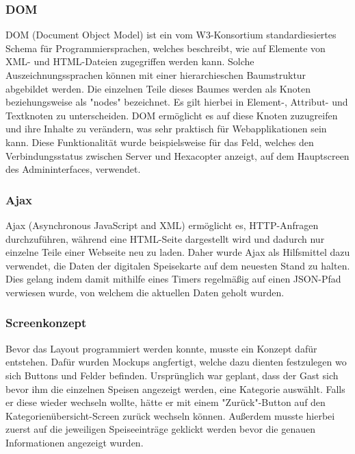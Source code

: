     \subsubsection{DOM}

{DOM\cite{dom}} (Document Object Model) ist ein vom W3-Konsortium standardiesiertes Schema für Programmiersprachen, welches beschreibt, wie auf Elemente von XML- und HTML-Dateien zugegriffen werden kann. Solche Auszeichnungssprachen können mit einer hierarchieschen Baumstruktur abgebildet werden. Die einzelnen Teile dieses Baumes werden als Knoten beziehungsweise als "nodes" bezeichnet.  Es gilt hierbei in Element-, Attribut- und Textknoten zu unterscheiden. DOM ermöglicht es auf diese Knoten zuzugreifen und ihre Inhalte zu verändern, was sehr praktisch für Webapplikationen sein kann. Diese Funktionalität wurde beispielsweise für das Feld, welches den Verbindungsstatus zwischen Server und Hexacopter anzeigt, auf dem Hauptscreen des Admininterfaces, verwendet.

    \subsubsection{Ajax}

{Ajax\cite{ajax}} (Asynchronous JavaScript and XML) ermöglicht es, HTTP-Anfragen durchzuführen, während eine HTML-Seite dargestellt wird und dadurch nur einzelne Teile einer Webseite neu zu laden. Daher wurde Ajax als Hilfsmittel dazu verwendet, die Daten der digitalen Speisekarte auf dem neuesten Stand zu halten. Dies gelang indem damit mithilfe eines Timers regelmäßig auf einen JSON-Pfad verwiesen wurde, von welchem die aktuellen Daten geholt wurden.

    \subsubsection{Screenkonzept}
Bevor das Layout programmiert werden konnte, musste ein Konzept dafür entstehen. Dafür wurden Mockups angfertigt, welche dazu dienten festzulegen wo sich Buttons und Felder befinden.
Ursprünglich war geplant, dass der Gast sich bevor ihm die einzelnen Speisen angezeigt werden, eine Kategorie auswählt. Falls er diese wieder wechseln wollte, hätte er mit einem "Zurück"-Button auf den Kategorienübersicht-Screen zurück wechseln können. Außerdem musste hierbei zuerst auf die jeweiligen Speiseeinträge geklickt werden bevor die genauen Informationen angezeigt wurden.
\\
\pagebreak

